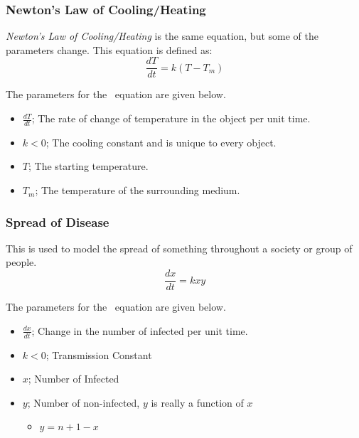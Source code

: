 		\subsubsection{Newton's Law of Cooling/Heating} \label{subsubsec:Newton Law of Cooling/Heating}
			\begin{definition} \label{def:Newton Law of Cooling/Heating}
				\emph{Newton's Law of Cooling/Heating} is the same equation, but some of the parameters change.
				This equation is defined as:
				\begin{equation} \label{eq:Newton Law of Cooling/Heating}
					\frac{dT}{dt} = k \left( T-T_{m} \right)
				\end{equation}
				\begin{remark} \label{rmk:Newton Law of Cooling/Heating Parameters}
					The parameters for the ~equation are given below.
					\begin{itemize}[noitemsep, nolistsep]
						\item $\frac{dT}{dt}$; The rate of change of temperature in the object per unit time.
						\item $k<0$; The cooling constant and is unique to every object.
						\item $T$; The starting temperature.
						\item $T_{m}$; The temperature of the surrounding medium.
					\end{itemize}
				\end{remark}
			\end{definition}
		\subsubsection{Spread of Disease} \label{subsubsec:Spread of Disease}
			\begin{definition} \label{def:Spread of Disease}
				This is used to model the spread of something throughout a society or group of people.
				\begin{equation} \label{eq:Spread of Disease}
					\frac{dx}{dt} = kxy
				\end{equation}
				\begin{remark}
					The parameters for the ~equation are given below.
					\begin{itemize}[noitemsep, nolistsep]
						\item $\frac{dx}{dt}$; Change in the number of infected per unit time.
						\item $k<0$; Transmission Constant
						\item$x$; Number of Infected
						\item $y$; Number of non-infected, $y$ is really a function of $x$
						\begin{itemize}[noitemsep, nolistsep]
							\item $y = n+1-x$
						\end{itemize}
					\end{itemize}
				\end{remark}
			\end{definition}
		
